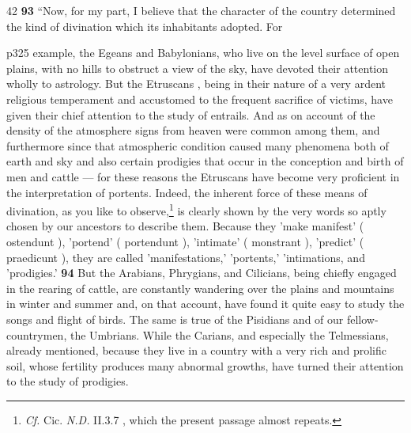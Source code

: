 42
\textbf{93} ``Now, for my part, I believe that the character of the country determined the kind of divination which its inhabitants adopted. For

p325 example, the Egeans and Babylonians, who live on the level surface of open plains, with no hills to obstruct a view of the sky, have devoted their attention wholly to astrology. But the Etruscans , being in their nature of a very ardent religious temperament and accustomed to the frequent sacrifice of victims, have given their chief attention to the study of entrails. And as on account of the density of the atmosphere signs from heaven were common among them, and furthermore since that atmospheric condition caused many phenomena both of earth and sky and also certain prodigies that occur in the conception and birth of men and cattle \texthebrew{—} for these reasons the Etruscans have become very proficient in the interpretation of portents. Indeed, the inherent force of these means of divination, as you like to observe,\texthebrew{}\footnote{\emph{Cf.} Cic. \emph{N.D.} II.3.7 , which the present passage almost repeats.

} is clearly shown by the very words so aptly chosen by our ancestors to describe them. Because they 'make manifest' ( ostendunt ), 'portend' ( portendunt ), 'intimate' ( monstrant ), 'predict' ( praedicunt ), they are called 'manifestations,' 'portents,' 'intimations, and 'prodigies.' \textbf{94} But the Arabians, Phrygians, and Cilicians, being chiefly engaged in the rearing of cattle, are constantly wandering over the plains and mountains in winter and summer and, on that account, have found it quite easy to study the songs and flight of birds. The same is true of the Pisidians and of our fellow-countrymen, the Umbrians. While the Carians, and especially the Telmessians, already mentioned, because they live in a country with a very rich and prolific soil, whose fertility produces many abnormal growths, have turned their attention to the study of prodigies.

